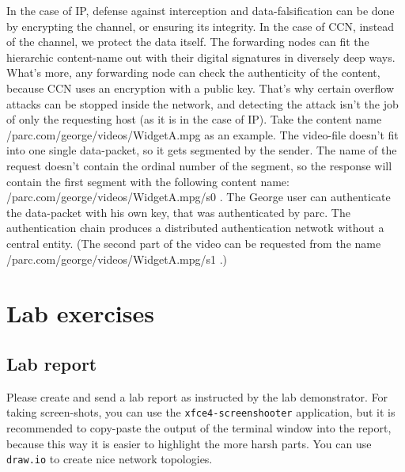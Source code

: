 \documentclass[a4paper]{article}
\begin{document}
In the case of IP, defense against interception and data-falsification can be done by encrypting the
channel, or ensuring its integrity. In the case of CCN, instead of the channel, we protect the
data itself. The forwarding nodes can fit the hierarchic content-name out with their digital 
signatures in diversely deep ways. What's more, any forwarding node can check the authenticity of the
content, because CCN uses an encryption with a public key. That's why certain overflow attacks can be
stopped inside the network, and detecting the attack isn't the job of only the requesting host (as 
it is in the case of IP). Take the content name /parc.com/george/videos/WidgetA.mpg as an example.
The video-file doesn't fit into one single data-packet, so it gets segmented by the sender. The name
of the request doesn't contain the ordinal number of the segment, so the response will contain the
first segment with the following content name: /parc.com/george/videos/WidgetA.mpg/s0 . The George
user can authenticate the data-packet with his own key, that was authenticated by parc. The 
authentication chain produces a distributed authentication netwotk without a central entity. (The 
second part of the video can be requested from the name /parc.com/george/videos/WidgetA.mpg/s1 .)





\appendix

\section{Lab exercises}


\subsection{Lab report}

Please create and send a lab report as instructed by the lab demonstrator. For taking screen-shots, you can use the \verb!xfce4-screenshooter! application, but it is 
recommended to copy-paste the output of the terminal window into the report, because this way it is
easier to highlight the more harsh parts. You can use \verb!draw.io! to create nice network topologies.
\end{document}
